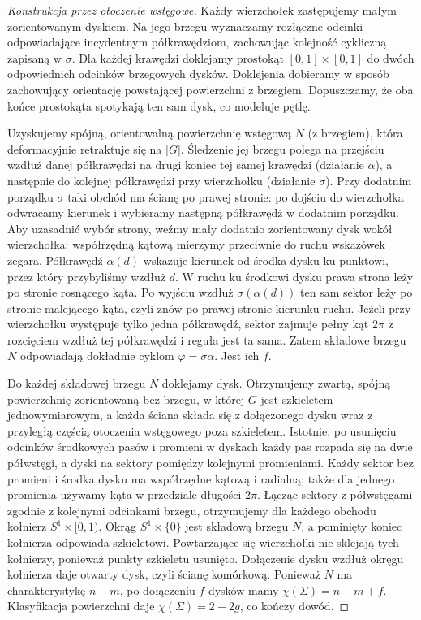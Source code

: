 \begin{proof}[Konstrukcja przez otoczenie wstęgowe]
Każdy wierzchołek zastępujemy małym zorientowanym
dyskiem. Na jego brzegu wyznaczamy rozłączne odcinki
odpowiadające incydentnym półkrawędziom, zachowując
kolejność cykliczną zapisaną w $\sigma$.
Dla każdej krawędzi doklejamy prostokąt
$[0,1]\times[0,1]$ do dwóch odpowiednich odcinków
brzegowych dysków. Doklejenia dobieramy w sposób
zachowujący orientację powstającej powierzchni z brzegiem.
Dopuszczamy, że oba końce prostokąta spotykają ten sam dysk,
co modeluje pętlę.

Uzyskujemy spójną, orientowalną powierzchnię wstęgową $N$
(z brzegiem), która deformacyjnie retraktuje się na $|G|$.
Śledzenie jej brzegu polega na przejściu wzdłuż danej
półkrawędzi na drugi koniec tej samej krawędzi (działanie
$\alpha$), a następnie do kolejnej półkrawędzi przy
wierzchołku (działanie $\sigma$). Przy dodatnim
porządku $\sigma$ taki obchód ma ścianę po prawej
stronie: po dojściu do wierzchołka odwracamy
kierunek i wybieramy następną półkrawędź
w dodatnim porządku. Aby uzasadnić wybór strony, weźmy
mały dodatnio zorientowany dysk wokół wierzchołka:
współrzędną kątową mierzymy przeciwnie do ruchu wskazówek
zegara. Półkrawędź $\alpha(d)$ wskazuje kierunek od środka
dysku ku punktowi, przez który przybyliśmy wzdłuż $d$.
W ruchu ku środkowi dysku prawa strona leży po stronie
rosnącego kąta. Po wyjściu wzdłuż $\sigma(\alpha(d))$
ten sam sektor leży po stronie malejącego kąta,
czyli znów po prawej stronie kierunku ruchu.
Jeżeli przy wierzchołku występuje tylko jedna
półkrawędź, sektor zajmuje pełny kąt $2\pi$ z rozcięciem
wzdłuż tej półkrawędzi i reguła jest ta sama.
Zatem składowe brzegu
$N$ odpowiadają dokładnie cyklom $\varphi=\sigma\alpha$.
Jest ich $f$.

Do każdej składowej brzegu $N$ doklejamy dysk.
Otrzymujemy zwartą, spójną powierzchnię zorientowaną
bez brzegu, w której $G$ jest szkieletem jednowymiarowym,
a każda ściana składa się z dołączonego dysku wraz
z przyległą częścią otoczenia wstęgowego poza szkieletem.
Istotnie, po usunięciu odcinków środkowych pasów
i promieni w dyskach każdy pas rozpada się na dwie
półwstęgi, a dyski na sektory pomiędzy kolejnymi
promieniami. Każdy sektor bez promieni i środka
dysku ma współrzędne kątową i radialną; także dla
jednego promienia używamy kąta w przedziale długości
$2\pi$. Łącząc sektory z półwstęgami zgodnie
z kolejnymi odcinkami brzegu, otrzymujemy dla
każdego obchodu kołnierz $S^1\times[0,1)$.
Okrąg $S^1\times\{0\}$ jest składową brzegu $N$,
a pominięty koniec kołnierza odpowiada szkieletowi.
Powtarzające się wierzchołki nie sklejają tych
kołnierzy, ponieważ punkty szkieletu usunięto.
Dołączenie dysku wzdłuż okręgu kołnierza daje
otwarty dysk, czyli ścianę komórkową.
Ponieważ $N$ ma charakterystykę $n-m$, po dołączeniu
$f$ dysków mamy $\chi(\Sigma)=n-m+f$.
Klasyfikacja powierzchni daje $\chi(\Sigma)=2-2g$,
co kończy dowód.
\end{proof}


